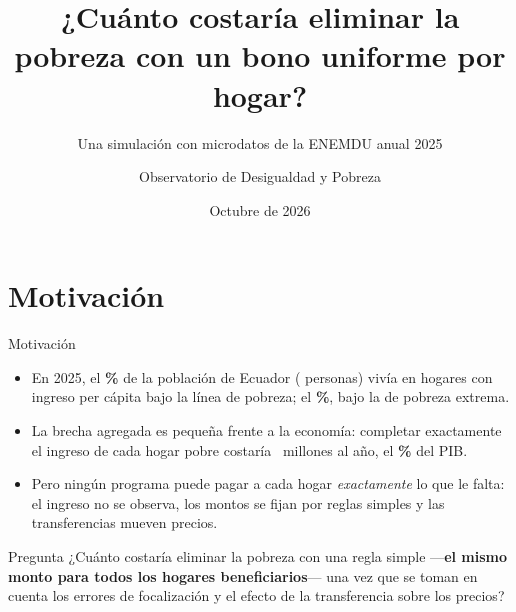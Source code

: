 \documentclass[aspectratio=169,11pt]{beamer}
\title{¿Cuánto costaría eliminar la pobreza con un bono uniforme por hogar?}
\subtitle{Una simulación con microdatos de la ENEMDU anual 2025}
\author{Observatorio de Desigualdad y Pobreza}
\institute{FLACSO Ecuador}
\date{Octubre de 2026}
\newcommand{\usd}[1]{\text{USD~#1}}
\newcommand{\MM}{millones}
\begin{document}
\maketitle

\section{Motivación}

\begin{frame}{Motivación}
  \begin{itemize}
    \item En 2025, el \textbf{\cPobInc\%} de la población de Ecuador (\cPobPer{} personas) vivía en hogares
      con ingreso per cápita bajo la línea de pobreza; el \textbf{\cExtInc\%}, bajo la de pobreza extrema.
    \item La brecha agregada es pequeña frente a la economía: completar exactamente el ingreso de cada hogar
      pobre costaría \usd{\cBrechaAnual}~\MM{} al año, el \textbf{\cBrechaAnualPIB\%} del PIB.
    \item Pero ningún programa puede pagar a cada hogar \emph{exactamente} lo que le falta: el ingreso no se
      observa, los montos se fijan por reglas simples y las transferencias mueven precios.
  \end{itemize}
  \vspace{0.6em}
  \begin{block}{Pregunta}
    ¿Cuánto costaría eliminar la pobreza con una regla simple —\textbf{el mismo monto para todos los hogares
    beneficiarios}— una vez que se toman en cuenta los errores de focalización y el efecto de la transferencia
    sobre los precios?
  \end{block}
\end{frame}
\end{document}
